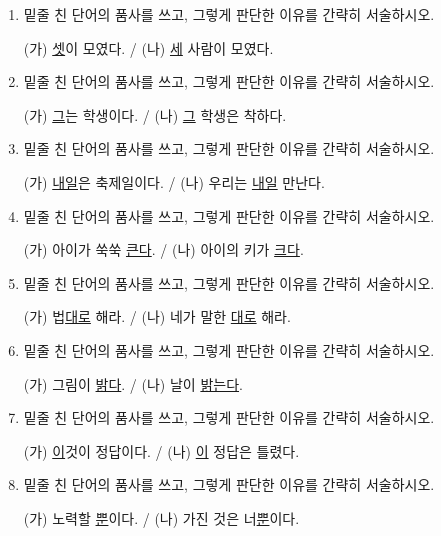 \documentclass[fs9,seriesRus]{korfarm-base}
\begin{document}
\kfActivityBg {}
\par{}\par\nopagebreak[4]\smallskip\nopagebreak[4]
\begin{enumerate}[leftmargin=22pt, itemsep=6pt, topsep=4pt, label=\textbf{\arabic*.}]
\item 밑줄 친 단어의 품사를 쓰고, 그렇게 판단한 이유를 간략히 서술하시오.
\begin{kfEvidence}(가) \uline{셋}이 모였다. / (나) \uline{세} 사람이 모였다.\end{kfEvidence}
\item 밑줄 친 단어의 품사를 쓰고, 그렇게 판단한 이유를 간략히 서술하시오.
\begin{kfEvidence}(가) \uline{그}는 학생이다. / (나) \uline{그} 학생은 착하다.\end{kfEvidence}
\item 밑줄 친 단어의 품사를 쓰고, 그렇게 판단한 이유를 간략히 서술하시오.
\begin{kfEvidence}(가) \uline{내일}은 축제일이다. / (나) 우리는 \uline{내일} 만난다.\end{kfEvidence}
\item 밑줄 친 단어의 품사를 쓰고, 그렇게 판단한 이유를 간략히 서술하시오.
\begin{kfEvidence}(가) 아이가 쑥쑥 \uline{큰다}. / (나) 아이의 키가 \uline{크다}.\end{kfEvidence}
\item 밑줄 친 단어의 품사를 쓰고, 그렇게 판단한 이유를 간략히 서술하시오.
\begin{kfEvidence}(가) 법\uline{대로} 해라. / (나) 네가 말한 \uline{대로} 해라.\end{kfEvidence}
\item 밑줄 친 단어의 품사를 쓰고, 그렇게 판단한 이유를 간략히 서술하시오.
\begin{kfEvidence}(가) 그림이 \uline{밝다}. / (나) 날이 \uline{밝는다}.\end{kfEvidence}
\item 밑줄 친 단어의 품사를 쓰고, 그렇게 판단한 이유를 간략히 서술하시오.
\begin{kfEvidence}(가) \uline{이}것이 정답이다. / (나) \uline{이} 정답은 틀렸다.\end{kfEvidence}
\item 밑줄 친 단어의 품사를 쓰고, 그렇게 판단한 이유를 간략히 서술하시오.
\begin{kfEvidence}(가) 노력할 \uline{뿐}이다. / (나) 가진 것은 너\uline{뿐}이다.\end{kfEvidence}
\end{enumerate}
\end{document}
